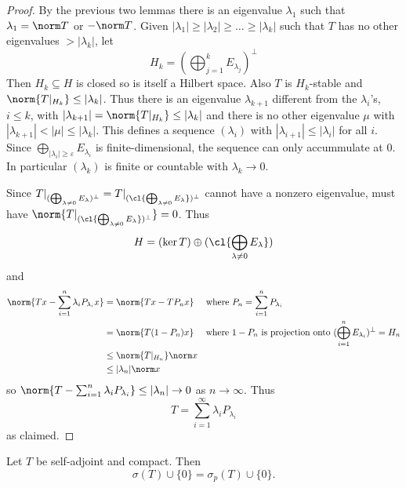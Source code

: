 \documentclass[a4paper]{article}
\begin{document}
\begin{proof}
  By the previous two lemmas there is an eigenvalue \(\lambda_1\) such that \(\lambda_1 = \norm T\) or \(- \norm T\). Given \(|\lambda_1| \geq |\lambda_2| \geq \dots \geq |\lambda_k|\) such that \(T\) has no other eigenvalues \(> |\lambda_k|\), let
  \[
    H_k = (\bigoplus_{j = 1}^k E_{\lambda_j})^\perp
  \]
  Then \(H_k \subseteq H\) is closed so is itself a Hilbert space. Also \(T\) is \(H_k\)-stable and \(\norm{T|_{H_k}} \leq |\lambda_k|\). Thus there is an eigenvalue \(\lambda_{k + 1}\) different from the \(\lambda_i\)'s, \(i \leq k\), with \(|\lambda_{k + 1}| = \norm{T|_{H_k}} \leq |\lambda_k|\) and there is no other eigenvalue \(\mu\) with \(|\lambda_{k + 1}| < |\mu| \leq |\lambda_k|\). This defines a sequence \((\lambda_i)\) with \(|\lambda_{i + 1}| \leq |\lambda_i|\) for all \(i\). Since \(\bigoplus_{|\lambda_i| \geq \varepsilon} E_{\lambda_i}\) is finite-dimensional, the sequence can only accummulate at \(0\). In particular \((\lambda_k)\) is finite or countable with \(\lambda_k \to 0\).

  Since \(T|_{(\bigoplus_{\lambda \neq 0} E_\lambda)^\perp} = T|_{(\cl{\bigoplus_{\lambda \neq 0} E_\lambda})^\perp}\) cannot have a nonzero eigenvalue, must have \(\norm{T|_{(\cl{\bigoplus_{\lambda \neq 0} E_\lambda})^\perp}} = 0\). Thus
  \[
    H = (\ker T) \oplus (\cl{\bigoplus_{\lambda \neq 0} E_\lambda})
  \]
  and
  \begin{align*}
    \norm{Tx - \sum_{i = 1}^n \lambda_i P_{\lambda_i} x}
    &= \norm{Tx - TP_n x} \quad \text{ where } P_n = \sum_{i = 1}^n P_{\lambda_i} \\
    &= \norm{T(1 - P_n) x} \quad \text{ where } 1 - P_n \text{ is projection onto } (\bigoplus_{i = 1}^n E_{\lambda_i})^\perp = H_n \\
    &\leq \norm{T|_{H_n}} \norm x \\
    &\leq |\lambda_n| \norm x
  \end{align*}
  so \(\norm{T - \sum_{i = 1}^n \lambda_i P_{\lambda_i}} \leq |\lambda_n| \to 0\) as \(n \to \infty\). Thus
  \[
    T = \sum_{i = 1}^\infty \lambda_i P_{\lambda_i}
  \]
  as claimed.
\end{proof}

\begin{corollary}
  Let \(T\) be self-adjoint and compact. Then
  \[
    \sigma(T) \cup \{0\} = \sigma_p(T) \cup \{0\}.
  \]
\end{corollary}
\end{document}
